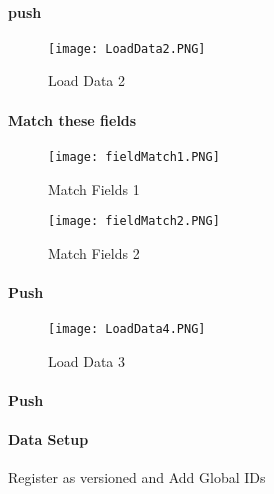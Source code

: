  \paragraph*{\Large push }
 \begin{figure}[h!]
 \centering
     \texttt{[image: LoadData2.PNG]}
 \caption{Load Data 2}
 \end{figure}
 \clearpage
 \paragraph[Match these fields]{\Large Match these fields}

 \begin{figure}[h!]
 \centering
     \texttt{[image: fieldMatch1.PNG]}
 \vspace{-.2in}

 \caption{Match Fields 1}
 \end{figure}
 \begin{figure}[h!]
 \centering
     \texttt{[image: fieldMatch2.PNG]}
 \vspace{-.2in}

 \caption{Match Fields 2}
 \end{figure}
 \clearpage
 \paragraph*{\Large Push }
 \begin{figure}[h!]
 \centering
     \texttt{[image: LoadData4.PNG]}
 \caption{Load Data 3}
 \end{figure}
 \paragraph*{\Large Push }
 \clearpage
 \paragraph{Data Setup}
 \vspace{.2in}

 Register as versioned and Add Global IDs
 \vspace{.2in}

 \vspace{.2in}

